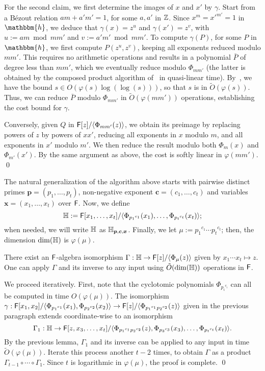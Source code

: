   For the second claim, we first determine the images of $x$ and $x'$
  by $\gamma$. Start from a B\'ezout relation $am+ a'm'=1$, for some
  $a,a'$ in $\mathbb{Z}$.  Since $x^m = {x'}^{m'}=1$ in $\mathbbm{h}$, we
  deduce that $\gamma(x)=z^{u}$ and $\gamma(x') = z^{v}$, with $u:=am
  \bmod mm'$ and $v:=a'm' \bmod mm'$. To compute $\gamma(P)$, for some
  $P$ in $\mathbbm{h}$, we first compute $P(z^u, z^v)$, keeping all
  exponents reduced modulo $mm'$. This requires no arithmetic
  operations and results in a polynomial $\bar P$ of degree less than
  $mm'$, which we eventually reduce modulo $\Phi_{mm'}$ (the latter is
  obtained by the composed product algorithm of~\cite{BoFlSaSc06} in
  quasi-linear time).  By~\cite[Theorem~8.8.7]{BacSha96}, we have the
  bound $s \in O(\varphi(s) \log(\log(s)))$, so that $s$ is in
  $\tilde{O}(\varphi(s))$. Thus, we can reduce $\bar P$ modulo
  $\Phi_{mm'}$ in $\tilde{O}(\varphi(mm'))$ operations, establishing
  the cost bound for $\gamma$.

  Conversely, given $Q$ in ${\mathsf{F}}[z]/\langle\Phi_{mm'}(z)\rangle$, we obtain
  its preimage by replacing powers of $z$ by powers of $xx'$, reducing all
  exponents in $x$ modulo $m$, and all exponents in $x'$ modulo $m'$.  We
  then reduce the result modulo both $\Phi_m(x)$ and $\Phi_{m'}(x')$.  By
  the same argument as above, the cost is softly linear in $\varphi(mm')$.
\qed

  The natural
generalization of the algorithm above starts with pairwise distinct
primes $\boldsymbol{p}=(p_1,\dots,p_t)$, non-negative exponent
$\boldsymbol{c}=(c_1,\dots,c_t)$ and variables
$\boldsymbol{x}=(x_1,\dots,x_t)$ over ${\mathsf{F}}$. Now, we define
$$\mathbb{H}:={\mathsf{F}}[x_1,\dots,x_t]/\langle
\Phi_{{p_1}^{c_1}}(x_1),\dots,\Phi_{{p_t}^{c_t}}(x_t)\rangle;$$ when
needed, we will write $\mathbb{H}$ as
$\mathbb{H}_{\boldsymbol{p},\boldsymbol{c},\boldsymbol{x}}$. Finally, we let
$\mu:={p_1}^{c_1}\cdots {p_t}^{c_t}$; then, the dimension $\dim(\mathbb{H})$ is
$\varphi(\mu)$.

\begin{lemma}\label{lemma:distinctP}
 There exist an ${\mathsf{F}}$-algebra isomorphism $\Gamma: \mathbb{H} \to
 {\mathsf{F}}[z]/\langle\Phi_{\mu}(z)\rangle$ given by $x_1 \cdots x_t \mapsto
 z$.  One can apply $\Gamma$ and its inverse to any input using
 $\tilde{O}(\dim(\mathbb{H}))$ operations in ${\mathsf{F}}$.
\end{lemma}
  We proceed iteratively. First, note that the cyclotomic polynomials
  $\Phi_{{p_i}^{c_i}}$ can all be computed in time $O(\varphi(\mu))$. 
  The isomorphism
  $\gamma: {\mathsf{F}}[x_1,x_2]/\langle \Phi_{{p_1}^{c_1}}(x_1),
  \Phi_{{p_2}^{c_2}}(x_2)\rangle \to {\mathsf{F}}[z]/\langle
  \Phi_{{p_1}^{c_1}{p_2}^{c_2}}(z)\rangle$
given in the previous paragraph extends coordinate-wise to an
  isomorphism
  $$\Gamma_1: \mathbb{H} \to {\mathsf{F}}[z,x_3,\dots,x_t]/\langle
  \Phi_{{p_1}^{c_1}{p_2}^{c_2}}(z),\Phi_{{p_3}^{c_3}}(x_3),\dots,\Phi_{{p_t}^{c_t}}(x_t)\rangle.$$
  By the previous lemma, $\Gamma_1$ and its inverse can be applied to
  any input in time $\tilde{O}(\varphi(\mu))$. Iterate this process
  another $t-2$ times, to obtain $\Gamma$ as a product
  $\Gamma_{t-1} \circ \cdots \circ \Gamma_1$. Since $t$ is logarithmic 
  in $\varphi(\mu)$, the proof is complete.
\qed


